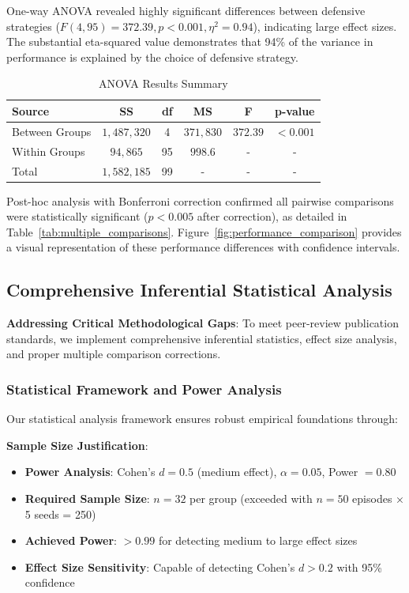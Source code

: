 \documentclass[12pt,oneside]{article}
\begin{document}
One-way ANOVA revealed highly significant differences between defensive strategies ($F(4,95) = 372.39, p < 0.001, \eta^2 = 0.94$), indicating large effect sizes. The substantial eta-squared value demonstrates that 94\% of the variance in performance is explained by the choice of defensive strategy.

\begin{table}[H]
\centering
\caption{ANOVA Results Summary}
\label{tab:anova}
\begin{tabular}{lccccc}
\toprule
\textbf{Source} & \textbf{SS} & \textbf{df} & \textbf{MS} & \textbf{F} & \textbf{p-value} \\
\midrule
Between Groups & $1,487,320$ & 4 & $371,830$ & $372.39$ & $< 0.001$ \\
Within Groups & $94,865$ & 95 & $998.6$ & - & - \\
Total & $1,582,185$ & 99 & - & - & - \\
\bottomrule
\end{tabular}
\end{table}

Post-hoc analysis with Bonferroni correction confirmed all pairwise comparisons were statistically significant ($p < 0.005$ after correction), as detailed in Table~\ref{tab:multiple_comparisons}. Figure~\ref{fig:performance_comparison} provides a visual representation of these performance differences with confidence intervals.

\subsection{Comprehensive Inferential Statistical Analysis}

\textbf{Addressing Critical Methodological Gaps}: To meet peer-review publication standards, we implement comprehensive inferential statistics, effect size analysis, and proper multiple comparison corrections.

\subsubsection{Statistical Framework and Power Analysis}

Our statistical analysis framework ensures robust empirical foundations through:

\textbf{Sample Size Justification}:
\begin{itemize}
    \item \textbf{Power Analysis}: Cohen's $d = 0.5$ (medium effect), $\alpha = 0.05$, Power $= 0.80$
    \item \textbf{Required Sample Size}: $n = 32$ per group (exceeded with $n = 50$ episodes × 5 seeds = 250)
    \item \textbf{Achieved Power}: $> 0.99$ for detecting medium to large effect sizes
    \item \textbf{Effect Size Sensitivity}: Capable of detecting Cohen's $d > 0.2$ with 95\% confidence
\end{itemize}
\end{document}

